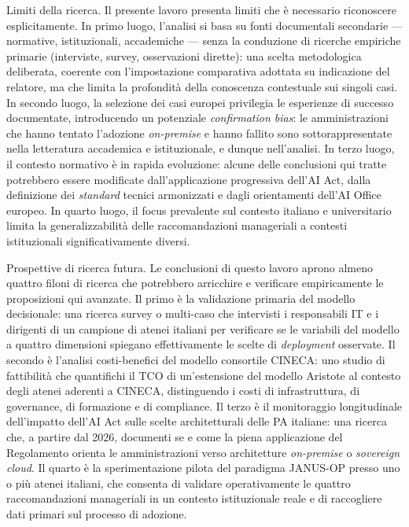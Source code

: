 Limiti della ricerca.
Il presente lavoro presenta limiti che è necessario riconoscere esplicitamente.
In primo luogo, l'analisi si basa su fonti documentali secondarie --- normative,
istituzionali, accademiche --- senza la conduzione di ricerche empiriche primarie
(interviste, survey, osservazioni dirette): una scelta metodologica deliberata,
coerente con l'impostazione comparativa adottata su indicazione del relatore,
ma che limita la profondità della conoscenza contestuale sui singoli casi. In secondo
luogo, la selezione dei casi europei privilegia le esperienze di successo documentate,
introducendo un potenziale \textit{confirmation bias}: le amministrazioni che hanno
tentato l'adozione \textit{on-premise} e hanno fallito sono sottorappresentate nella
letteratura accademica e istituzionale, e dunque nell'analisi. In terzo luogo,
il contesto normativo è in rapida evoluzione: alcune delle conclusioni qui tratte
potrebbero essere modificate dall'applicazione progressiva dell'AI Act, dalla
definizione dei \textit{standard} tecnici armonizzati e dagli orientamenti
dell'AI Office europeo. In quarto luogo, il focus prevalente sul contesto italiano
e universitario limita la generalizzabilità delle raccomandazioni manageriali a
contesti istituzionali significativamente diversi.

\medskip

Prospettive di ricerca futura.
Le conclusioni di questo lavoro aprono almeno quattro filoni di ricerca che potrebbero
arricchire e verificare empiricamente le proposizioni qui avanzate. Il primo è la
validazione primaria del modello decisionale: una ricerca survey o
multi-caso che intervisti i responsabili IT e i dirigenti di un campione di atenei
italiani per verificare se le variabili del modello a quattro dimensioni spiegano
effettivamente le scelte di \textit{deployment} osservate. Il secondo è l'analisi
costi-benefici del modello consortile CINECA: uno studio di fattibilità che quantifichi
il TCO di un'estensione del modello Aristote al contesto degli atenei aderenti a
CINECA, distinguendo i costi di infrastruttura, di governance, di formazione e di
compliance. Il terzo è il monitoraggio longitudinale dell'impatto dell'AI Act
sulle scelte architetturali delle PA italiane: una ricerca che, a partire dal 2026,
documenti se e come la piena applicazione del Regolamento orienta le amministrazioni
verso architetture \textit{on-premise} o \textit{sovereign cloud}. Il quarto è la
sperimentazione pilota del paradigma JANUS-OP presso uno o più atenei
italiani, che consenta di validare operativamente le quattro raccomandazioni
manageriali in un contesto istituzionale reale e di raccogliere dati primari sul
processo di adozione.


